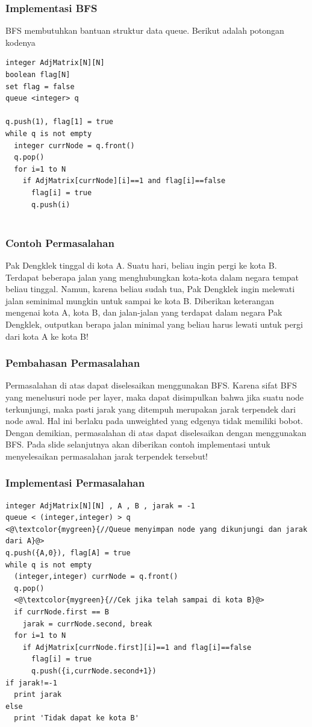 \begin{frame}[fragile]
\frametitle{Implementasi BFS}
BFS membutuhkan bantuan struktur data queue. Berikut adalah potongan kodenya\newline
\begin{lstlisting}
integer AdjMatrix[N][N]
boolean flag[N]
set flag = false
queue <integer> q

q.push(1), flag[1] = true
while q is not empty
  integer currNode = q.front()
  q.pop()
  for i=1 to N
    if AdjMatrix[currNode][i]==1 and flag[i]==false
      flag[i] = true
      q.push(i)
        
\end{lstlisting}
\end{frame}

\begin{frame}
\frametitle{Contoh Permasalahan}
Pak Dengklek tinggal di kota A. Suatu hari, beliau ingin pergi ke kota B. Terdapat beberapa jalan yang menghubungkan kota-kota dalam negara tempat beliau tinggal. Namun, karena beliau sudah tua, Pak Dengklek ingin melewati jalan seminimal mungkin untuk sampai ke kota B.
\newline\newline
Diberikan keterangan mengenai kota A, kota B, dan jalan-jalan yang terdapat dalam negara Pak Dengklek, outputkan berapa jalan minimal yang beliau harus lewati untuk pergi dari kota A ke kota B!
\end{frame}

\begin{frame}
\frametitle{Pembahasan Permasalahan}
Permasalahan di atas dapat diselesaikan menggunakan BFS. Karena sifat BFS yang menelusuri node per layer, maka dapat disimpulkan bahwa jika suatu node terkunjungi, maka pasti jarak yang ditempuh merupakan jarak terpendek dari node awal. Hal ini berlaku pada unweighted \fgraph yang edgenya tidak memiliki bobot.
\newline\newline
Dengan demikian, permasalahan di atas dapat diselesaikan dengan menggunakan BFS. Pada slide selanjutnya akan diberikan contoh implementasi untuk menyelesaikan permasalahan jarak terpendek tersebut!
\end{frame}

\begin{frame}[fragile]
\frametitle{Implementasi Permasalahan}

\begin{lstlisting}
integer AdjMatrix[N][N] , A , B , jarak = -1
queue < (integer,integer) > q
<@\textcolor{mygreen}{//Queue menyimpan node yang dikunjungi dan jarak dari A}@>
q.push({A,0}), flag[A] = true
while q is not empty
  (integer,integer) currNode = q.front()
  q.pop()
  <@\textcolor{mygreen}{//Cek jika telah sampai di kota B}@>
  if currNode.first == B
    jarak = currNode.second, break
  for i=1 to N
    if AdjMatrix[currNode.first][i]==1 and flag[i]==false
      flag[i] = true
      q.push({i,currNode.second+1})
if jarak!=-1
  print jarak
else
  print 'Tidak dapat ke kota B'    
\end{lstlisting}
\end{frame}

